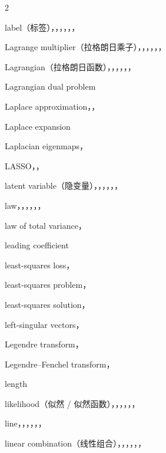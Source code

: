 \begin{multicols}{2}
\medskip{}\par\smallskip
\noindent label（标签），，，，，，\par
\noindent Lagrange multiplier（拉格朗日乘子），，，，，，\par
\noindent Lagrangian（拉格朗日函数），，，，，，\par
\noindent Lagrangian dual problem\par
\noindent Laplace approximation，，\par
\noindent Laplace expansion\par
\noindent Laplacian eigenmaps，\par
\noindent LASSO，，\par
\noindent latent variable（隐变量），，，，，，\par
\noindent law，，，，，，\par
\noindent law of total variance，\par
\noindent leading coefficient\par
\noindent least-squares loss，\par
\noindent least-squares problem，\par
\noindent least-squares solution，\par
\noindent left-singular vectors，\par
\noindent Legendre transform，\par
\noindent Legendre–Fenchel transform，\par
\noindent length\par
\noindent likelihood（似然 / 似然函数），，，，，，\par
\noindent line，，，，，，\par
\noindent linear combination（线性组合），，，，，，\par

\end{multicols}
